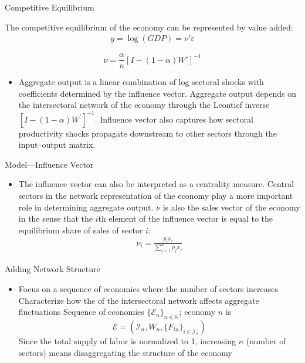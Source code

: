 \documentclass[dvipsnames]{beamer}
\begin{document}
%
\begin{frame}{Competitive Equilibrium}

The competitive equilibrium of the economy can be represented by value added:
\begin{align}
  y = \log (GDP) = \nu' \varepsilon
\end{align}

\begin{definition}
  \[
    \nu=\frac{\alpha}{n}[I-(1-\alpha)W']^{-1}
  \]
\end{definition}
\begin{itemize}
\item Aggregate output is a linear combination of log sectoral shocks with coefficients determined by the influence vector.
\vitem Aggregate output depends on the intersectoral network of the economy
through the Leontief inverse $[I - (1 - \alpha) W^\prime]^{-1}$.
\vitem Influence vector also  captures
how sectoral productivity shocks propagate downstream to other sectors
through the input–output matrix.
\end{itemize}
\end{frame}
%
\begin{frame}{Model---Influence Vector}
  \begin{itemize}
  \item The influence vector can also be interpreted as a centrality measure.
  \vitem Central sectors in the network representation of the economy play a more important role in determining aggregate output.
  \vitem 
$\nu$ is also the sales vector of the economy in the sense that the $i$th element of the influence vector is equal to the equilibrium
share of sales of sector $i$:
\begin{align}
  \nu_i=\frac{p_ix_i}{\sum \limits_{j=1}^np_jx_j}
\end{align}
  \end{itemize}
\end{frame}
%
\begin{frame}{Adding Network Structure}
  \begin{itemize}
  \item Focus on a sequence of economics where the number of sectors increases
    \vitem Characterize how the  of the intersectoral network affects aggregate fluctuations
    \vitem Sequence of economies $\{\mathcal{E}_n\}_{n \in \mathbb{N}}$; economy $n$ is
    \[
\mathcal{E} = (\mathcal{I}_n, W_n, \{F_{in}\}_{i \in \mathcal{I}_n})
    \]
    \vitem Since the total supply of labor is normalized to 1, increasing $n$ (number of sectors) means disaggregating the structure of the economy
  \end{itemize}
\end{frame}
\end{document}
